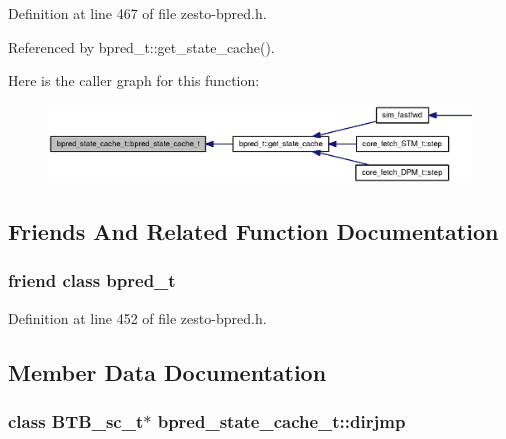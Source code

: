 Definition at line 467 of file zesto-bpred.h.

Referenced by bpred\_\-t::get\_\-state\_\-cache().

Here is the caller graph for this function:\nopagebreak
\begin{figure}[H]
\begin{center}
\leavevmode
\includegraphics[width=368pt]{classbpred__state__cache__t_52dc7d033f4f1c95aa44029fc9d40629_icgraph}
\end{center}
\end{figure}


\subsection{Friends And Related Function Documentation}
\subsubsection[{bpred\_\-t}]{\setlength{\rightskip}{0pt plus 5cm}friend class {\bf bpred\_\-t}\hspace{0.3cm}{\tt  [friend]}}\label{classbpred__state__cache__t_44319d3cf67079457eb46e2c6fcfeb49}




Definition at line 452 of file zesto-bpred.h.

\subsection{Member Data Documentation}
\subsubsection[{dirjmp}]{\setlength{\rightskip}{0pt plus 5cm}class {\bf BTB\_\-sc\_\-t}$\ast$ {\bf bpred\_\-state\_\-cache\_\-t::dirjmp}\hspace{0.3cm}{\tt  [protected]}}\label{classbpred__state__cache__t_18fc0f9e45a4925cfa20a32580a0acf0}




